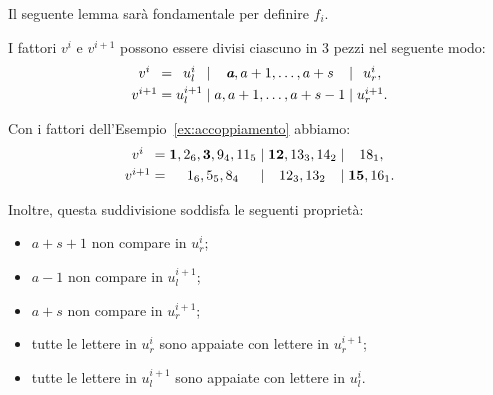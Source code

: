 Il seguente lemma sar\`a fondamentale per definire $f_i$.
\begin{lemma}
    \label{lem:divisione_in_3}
    I fattori $v^i$ e $ v^{i+1}$ possono essere divisi ciascuno in 3 pezzi nel seguente
    modo:
    \[
        \begin{array}{c@{\;}c@{\;}c@{\;}c@{\;}c@{\;}c@{\;}c}
            v^i &=& u^i_l &\mid&  \textbf{\em a}, a+1, \dots, a+s  &\mid& u^i_r ,  
            \\[\jot]
    v^{i+1} &=& u^{i+1}_l &\mid&  a, a+1, \dots, a+s-1  &\mid& u^{i+1}_r.
        \end{array}
    \]

    Con i fattori dell'Esempio~\ref{ex:accoppiamento} abbiamo:
    \[
        \begin{array}{c@{\;}c@{\;}c@{\;}c@{\;}c@{\;}c@{\;}c}
            v^i &=   &  \mathbf{1}, 2_6, \mathbf{3}, 9_4, 11_5
                &\mid& \mathbf{12}, 13_3, 14_2
                &\mid& 18_1 , \\[\jot]
            v^{i+1} &=   & 1_6, 5_5, 8_4
                    &\mid& 12_3, 13_2
                    &\mid& \mathbf{15}, 16_1.
        \end{array}
    \]

    Inoltre, questa suddivisione soddisfa le seguenti propriet\`a:
    \begin{itemize}
        \item $ a+s+1 $ non compare in $u^i_r$;
        \item $ a-1 $ non compare in $u^{i+1}_l$;
        \item $ a+s $ non compare in $u^{i+1}_r$;
        \item tutte le lettere in $u^i_r$ sono appaiate con lettere in $u^{i+1}_r$;
        \item tutte le lettere in $u^{i+1}_l$ sono appaiate con lettere in $u^{i}_l$.
    \end{itemize}
        
\end{lemma}

